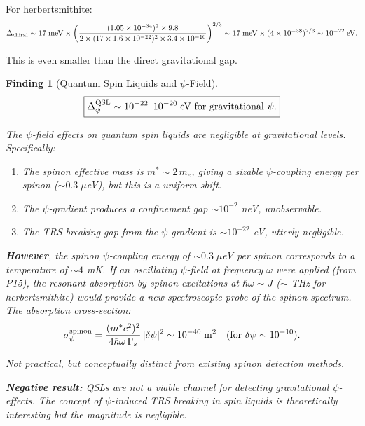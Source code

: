 \documentclass[11pt]{article}
\newtheorem{finding}{Finding}
\newcommand{\ee}[1]{\times 10^{#1}}
\begin{document}
For herbertsmithite:
\begin{equation}
\Delta_{\rm chiral} \sim 17\;\text{meV}\times\left(\frac{(1.05\ee{-34})^2\times 9.8}{2\times(17\times 1.6\ee{-22})^2\times 3.4\ee{-10}}\right)^{2/3} \sim 17\;\text{meV}\times(4\ee{-38})^{2/3} \sim 10^{-22}\;\text{eV}.
\end{equation}

This is even smaller than the direct gravitational gap.

\begin{finding}[Quantum Spin Liquids and $\psi$-Field]
\begin{equation}\label{eq:qsl}
\boxed{\Delta_\psi^{\rm QSL} \sim 10^{-22}\text{--}10^{-20}\;\text{eV for gravitational }\psi.}
\end{equation}

The $\psi$-field effects on quantum spin liquids are negligible at gravitational levels. Specifically:
\begin{enumerate}
\item The spinon effective mass is $m^* \sim 2\,m_e$, giving a sizable $\psi$-coupling energy per spinon ($\sim 0.3\;\mu$eV), but this is a uniform shift.
\item The $\psi$-gradient produces a confinement gap $\sim 10^{-2}$ neV, unobservable.
\item The TRS-breaking gap from the $\psi$-gradient is $\sim 10^{-22}$ eV, utterly negligible.
\end{enumerate}

\textbf{However}, the spinon $\psi$-coupling energy of $\sim 0.3\;\mu$eV per spinon corresponds to a temperature of $\sim 4$ mK. If an oscillating $\psi$-field at frequency $\omega$ were applied (from P15), the resonant absorption by spinon excitations at $\hbar\omega \sim J$ ($\sim$ THz for herbertsmithite) would provide a new spectroscopic probe of the spinon spectrum. The absorption cross-section:
\begin{equation}
\sigma_\psi^{\rm spinon} = \frac{(m^* c^2)^2}{4\hbar\omega\,\Gamma_s}\,|\delta\psi|^2 \sim 10^{-40}\;\text{m}^2 \quad (\text{for }\delta\psi \sim 10^{-10}).
\end{equation}

Not practical, but conceptually distinct from existing spinon detection methods.

\textbf{Negative result:} QSLs are not a viable channel for detecting gravitational $\psi$-effects. The concept of $\psi$-induced TRS breaking in spin liquids is theoretically interesting but the magnitude is negligible.
\end{finding}
\end{document}
